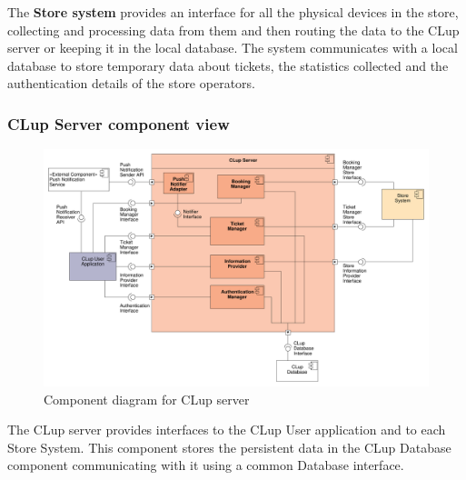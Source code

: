 The \textbf{Store system} provides an interface for all the physical devices in the store, collecting and processing data from them and then routing the data to the CLup server or keeping it in the local database. The system communicates with a local database to store temporary data about tickets, the statistics collected and the authentication details of the store operators.

\subsubsection{CLup Server component view}
\begin{figure}[H]
    \includegraphics[width=\textwidth]{Images/UML_server_component.pdf}
    \caption{\label{fig:UML_server_component}Component diagram for CLup server}
\end{figure}

The CLup server provides interfaces to the CLup User application and to each Store System. This component stores the persistent data in the CLup Database component communicating with it using a common Database interface.

